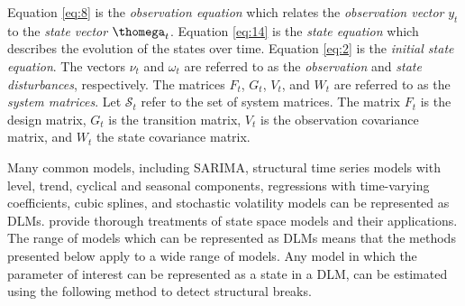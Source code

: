 \documentclass{article}
\begin{document}
Equation \eqref{eq:8} is the \textit{observation equation} which relates the \textit{observation vector} $y_{t}$ to the \textit{state vector} $\thomega_{t}$.
Equation \eqref{eq:14} is the \textit{state equation} which describes the evolution of the states over time.
Equation \eqref{eq:2} is the \textit{initial state equation}.
The vectors $\nu_{t}$ and $\omega_{t}$ are referred to as the \textit{observation} and \textit{state disturbances}, respectively.
The matrices $F_{t}$, $G_{t}$, $V_{t}$, and $W_{t}$ are referred to as the \textit{system matrices}.
Let $\mathcal{S}_{t}$ refer to the set of system matrices.
The matrix $F_{t}$ is the design matrix, $G_{t}$ is the transition matrix, $V_{t}$ is the observation covariance matrix, and $W_{t}$ the state covariance matrix.

Many common models, including SARIMA, structural time series models with level, trend, cyclical and seasonal components, regressions with time-varying coefficients, cubic splines, and stochastic volatility models can be represented as DLMs. 
\textcites{WestHarrison1997}{DurbinKoopman2001}{CommandeurKoopman2007}{PetrisPetroneOmegal2009}{ShumwayStoffer2010} provide thorough treatments of state space models and their applications.
The range of models which can be represented as DLMs means that the methods presented below apply to a wide range of models.
Any model in which the parameter of interest can be represented as a state in a DLM, can be estimated using the following method to detect structural breaks.
\end{document}
